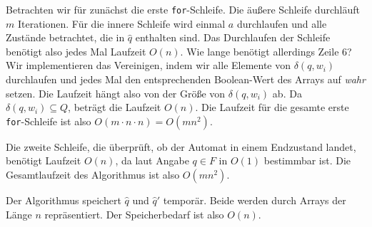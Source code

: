 \documentclass[11pt,a4paper]{article}
\begin{document}
\begin{loesung}
\begin{enumerate}
        Betrachten wir für zunächst die erste \texttt{for}-Schleife.
        Die äußere Schleife durchläuft $m$ Iterationen.
        Für die innere Schleife wird einmal $a$ durchlaufen und alle Zustände betrachtet, die in $\hat{q}$ enthalten sind.
        Das Durchlaufen der Schleife benötigt also jedes Mal Laufzeit $O(n)$.
        Wie lange benötigt allerdings Zeile 6?
        Wir implementieren das Vereinigen, indem wir alle Elemente von $\delta(q, w_i)$ durchlaufen und jedes Mal den entsprechenden Boolean-Wert des Arrays auf \emph{wahr} setzen.
        Die Laufzeit hängt also von der Größe von $\delta(q, w_i)$ ab.
        Da $\delta(q, w_i) \subseteq Q$, beträgt die Laufzeit $O(n)$.
        Die Laufzeit für die gesamte erste \texttt{for}-Schleife ist also $O(m \cdot n \cdot n) = O(m n^2)$.

        Die zweite Schleife, die überprüft, ob der Automat in einem Endzustand landet, benötigt Laufzeit $O(n)$, da laut Angabe $q \in F$ in $O(1)$ bestimmbar ist.
        Die Gesamtlaufzeit des Algorithmus ist also $O(mn^2)$.

        Der Algorithmus speichert $\hat{q}$ und $\hat{q}'$ temporär.
        Beide werden durch Arrays der Länge $n$ repräsentiert.
        Der Speicherbedarf ist also $O(n)$.
    \end{enumerate}
\end{loesung}
\end{document}
